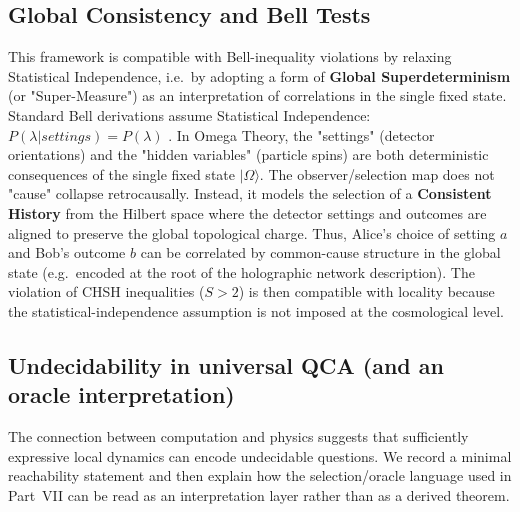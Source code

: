 \subsection{Global Consistency and Bell Tests}
This framework is compatible with Bell-inequality violations by relaxing Statistical Independence, i.e.\ by adopting a form of \textbf{Global Superdeterminism} (or "Super-Measure") as an interpretation of correlations in the single fixed state.
Standard Bell derivations assume Statistical Independence: $P(\lambda | settings) = P(\lambda)$ \cite{Bell1964,CHSH1969,Brunner2014BellNonlocality}. In Omega Theory, the "settings" (detector orientations) and the "hidden variables" (particle spins) are both deterministic consequences of the single fixed state $|\Omega\rangle$.
The observer/selection map does not "cause" collapse retrocausally. Instead, it models the selection of a \textbf{Consistent History} from the Hilbert space where the detector settings and outcomes are aligned to preserve the global topological charge.
Thus, Alice's choice of setting $a$ and Bob's outcome $b$ can be correlated by common-cause structure in the global state (e.g.\ encoded at the root of the holographic network description). The violation of CHSH inequalities ($S > 2$) is then compatible with locality because the statistical-independence assumption is not imposed at the cosmological level.

\subsection{Undecidability in universal QCA (and an oracle interpretation)}
The connection between computation and physics suggests that sufficiently expressive local dynamics can encode undecidable questions. We record a minimal reachability statement and then explain how the selection/oracle language used in Part~VII can be read as an interpretation layer rather than as a derived theorem.

